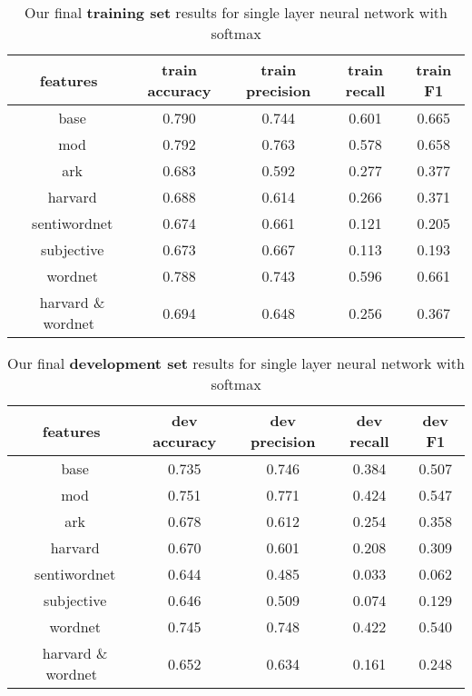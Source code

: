 \documentclass[11pt,letterpaper]{article}
\begin{document}
\clearpage

\begin{table}[htp]
\begin{center}
\begin{tabularx}{374pt}{|c|c|c|c|c|}
\hline
\bf features & \bf train accuracy & \bf train precision &\bf train recall &\bf train F1 \\
\hline
\ base & 0.790 & 0.744 & 0.601 & 0.665 \\
\ mod & 0.792 & 0.763 & 0.578 & 0.658 \\
\ ark & 0.683 & 0.592 & 0.277 & 0.377 \\
\ harvard & 0.688 & 0.614 & 0.266 & 0.371 \\
\ sentiwordnet & 0.674 & 0.661 & 0.121 & 0.205 \\
\ subjective & 0.673 & 0.667 & 0.113 & 0.193 \\
\ wordnet & 0.788 & 0.743 & 0.596 & 0.661 \\
\ harvard \& wordnet & 0.694 & 0.648 & 0.256 & 0.367 \\
\hline
\end{tabularx}
\end{center}
\caption{\label{final-results-train} Our final {\bf training set} results for single layer neural network with softmax }
\end{table}

\begin{table}[htp]
\begin{center}
\begin{tabularx}{347pt}{|c|c|c|c|c|}
\hline
\bf features & \bf dev accuracy &\bf dev precision &\bf dev recall & \bf dev F1 \\
\hline
\ base & 0.735 & 0.746 & 0.384 & 0.507 \\
\ mod & 0.751 & 0.771 & 0.424 & 0.547 \\
\ ark & 0.678 & 0.612 & 0.254 & 0.358 \\
\ harvard & 0.670 & 0.601 & 0.208 & 0.309 \\
\ sentiwordnet & 0.644 & 0.485 & 0.033 & 0.062 \\
\ subjective & 0.646 & 0.509 & 0.074 & 0.129 \\
\ wordnet & 0.745 & 0.748 & 0.422 & 0.540 \\
\ harvard \& wordnet & 0.652 & 0.634 & 0.161 & 0.248 \\
\hline
\end{tabularx}
\end{center}
\caption{\label{final-results-dev} Our final {\bf development set} results for single layer neural network with softmax }
\end{table}
\end{document}
